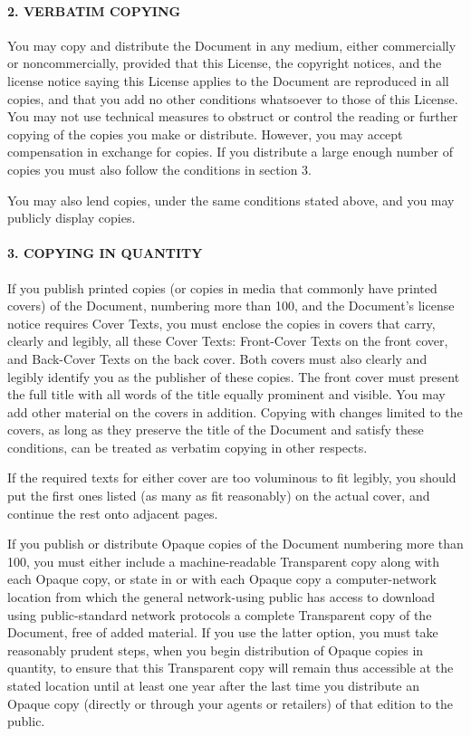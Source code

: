 \hypertarget{2-verbatim-copying}{%
\paragraph{2. VERBATIM COPYING}\label{2-verbatim-copying}}

You may copy and distribute the Document in any medium, either
commercially or noncommercially, provided that this License, the
copyright notices, and the license notice saying this License applies to
the Document are reproduced in all copies, and that you add no other
conditions whatsoever to those of this License. You may not use
technical measures to obstruct or control the reading or further copying
of the copies you make or distribute. However, you may accept
compensation in exchange for copies. If you distribute a large enough
number of copies you must also follow the conditions in section 3.

You may also lend copies, under the same conditions stated above, and
you may publicly display copies.

\hypertarget{3-copying-in-quantity}{%
\paragraph{3. COPYING IN QUANTITY}\label{3-copying-in-quantity}}

If you publish printed copies (or copies in media that commonly have
printed covers) of the Document, numbering more than 100, and the
Document's license notice requires Cover Texts, you must enclose the
copies in covers that carry, clearly and legibly, all these Cover Texts:
Front-Cover Texts on the front cover, and Back-Cover Texts on the back
cover. Both covers must also clearly and legibly identify you as the
publisher of these copies. The front cover must present the full title
with all words of the title equally prominent and visible. You may add
other material on the covers in addition. Copying with changes limited
to the covers, as long as they preserve the title of the Document and
satisfy these conditions, can be treated as verbatim copying in other
respects.

If the required texts for either cover are too voluminous to fit
legibly, you should put the first ones listed (as many as fit
reasonably) on the actual cover, and continue the rest onto adjacent
pages.

If you publish or distribute Opaque copies of the Document numbering
more than 100, you must either include a machine-readable Transparent
copy along with each Opaque copy, or state in or with each Opaque copy a
computer-network location from which the general network-using public
has access to download using public-standard network protocols a
complete Transparent copy of the Document, free of added material. If
you use the latter option, you must take reasonably prudent steps, when
you begin distribution of Opaque copies in quantity, to ensure that this
Transparent copy will remain thus accessible at the stated location
until at least one year after the last time you distribute an Opaque
copy (directly or through your agents or retailers) of that edition to
the public.

